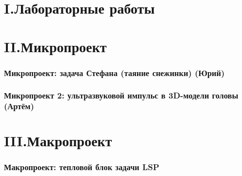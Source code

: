 \documentclass[12pt, a4paper]{article}
\begin{document}



\tableofcontents

\clearpage

\part*{I.\quad Лабораторные работы}
\setcounter{section}{0}


\clearpage


\clearpage


\clearpage

\part*{II.\quad Микропроект}
\setcounter{section}{0}

\section{Микропроект: задача Стефана (таяние снежинки) (Юрий)}

\clearpage

\section{Микропроект 2: ультразвуковой импульс в 3D-модели головы (Артём)}

\clearpage

\part*{III.\quad Макропроект}
\setcounter{section}{0}

\section{Макропроект: тепловой блок задачи LSP}

\clearpage


\end{document}
